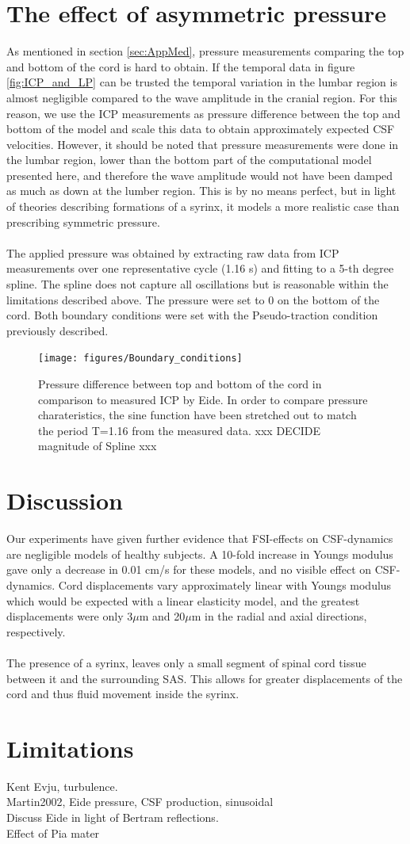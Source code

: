 \section{The effect of asymmetric pressure}
As mentioned in section \ref{sec:AppMed}, pressure measurements comparing the top and bottom of the cord is hard to obtain. If the temporal data in figure \ref{fig:ICP_and_LP} can be trusted the temporal variation in the lumbar region is almost negligible compared to the wave amplitude in the cranial region. For this reason, we use the ICP measurements as pressure difference between the top and bottom of the model and scale this data to obtain approximately expected CSF velocities. However, it should be noted that pressure measurements were done in the lumbar region, lower than the bottom part of the computational model presented here, and therefore the wave amplitude would not have been damped as much as down at the lumber region. This is by no means perfect, but in light of theories describing formations of a syrinx, it models a more realistic case than prescribing symmetric pressure.
\\
\\
The applied pressure was obtained by extracting raw data from ICP measurements over one representative cycle (1.16 s) and fitting to a 5-th degree spline. The spline does not capture all oscillations but is reasonable within the limitations described above. The pressure were set to 0 on the bottom of the cord. Both boundary conditions were set with the Pseudo-traction condition previously described. 
\begin{figure}[!h]
\begin{center}
\texttt{[image: figures/Boundary\_conditions]}
\caption{Pressure difference between top and bottom of the cord in comparison to measured ICP by Eide. In order to compare pressure charateristics, the sine function have been stretched out to match the period T=1.16 from the measured data. xxx DECIDE magnitude of Spline xxx}
\end{center}
\end{figure}
\section{Discussion}
Our experiments have given further evidence that FSI-effects on CSF-dynamics are negligible models of healthy subjects. A 10-fold increase in Youngs modulus gave only a decrease in 0.01 cm/s for these models, and no visible effect on CSF-dynamics. Cord displacements vary approximately linear with Youngs modulus which would be expected with a linear elasticity model, and the greatest displacements were only 3$\mu$m and 20$\mu$m in the radial and axial directions, respectively.
\\
\\
The presence of a syrinx, leaves only a small segment of spinal cord tissue between it and the surrounding SAS. This allows for greater displacements of the cord and thus fluid movement inside the syrinx. 
\section{Limitations}
Kent Evju, turbulence. \\
Martin2002, Eide pressure, CSF production, sinusoidal \\
Discuss Eide in light of Bertram reflections. \\
Effect of Pia mater
